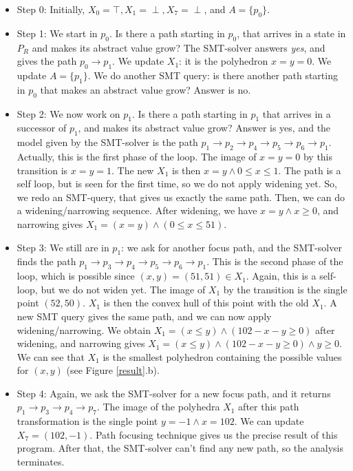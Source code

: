 \documentclass[a4paper,english,titlepage,11pt]{report}
\begin{document}
\begin{itemize}
\item Step 0: Initially, $X_0 = \top, X_1 = \perp, X_7 = \perp$, and $A =
\{p_0\}$.
\item Step 1: We start in $p_0$. Is there a path starting in $p_0$, that arrives
in a state in $P_R$ and makes its abstract value grow? The SMT-solver answers
\emph{yes}, and gives the path $p_0 \rightarrow p_1$. We update $X_1$:
it is the polyhedron $x=y=0$. We update $A = \{p_1\}$. 
We do another SMT query: is there another path
starting in $p_0$ that makes an abstract value grow? Answer is no.
\item Step 2: We now work on $p_1$. Is there a path starting in $p_1$ that
arrives in a successor of $p_1$, and makes its abstract value grow? Answer is
yes, and the model given by the SMT-solver is the path $p_1 \rightarrow p_2
\rightarrow p_4 \rightarrow p_5 \rightarrow p_6 \rightarrow p_1$. Actually, this
is the first phase of the loop. 
The image of $x=y=0$ by this transition is $x=y=1$. The new $X_1$ is then $x=y
\wedge 0\leq x \leq 1$. The path is a self loop, but is seen for the first time,
so we do not apply widening yet. So, we redo an SMT-query, that gives us exactly
the same path. Then, we can do a widening/narrowing sequence. 
After widening, we have $x=y \wedge x \geq 0$, and narrowing gives $X_1 = (x=y)
\wedge (0 \leq x \leq 51)$.
\item Step 3: We still are in $p_1$: we ask for another focus path, and the
SMT-solver finds the path $p_1 \rightarrow p_3
\rightarrow p_4 \rightarrow p_5 \rightarrow p_6 \rightarrow p_1$. This is the
second phase of the loop, which is possible since $(x,y)=(51,51) \in X_1$.
Again, this is a self-loop, but we do not widen yet. The
image of $X_1$ by the transition is the single point $(52,50)$. $X_1$ is then
the convex hull of this point with the old $X_1$. A new SMT query gives the same
path, and we can now apply widening/narrowing. We obtain
$X_1 = (x \leq y) \wedge (102 - x - y \geq 0)$ after widening, and narrowing
gives $X_1 = (x \leq y) \wedge (102 - x - y \geq 0) \wedge y \geq 0$.
We can see that $X_1$ is the smallest polyhedron containing the possible values
for $(x,y)$ (see Figure \ref{result}.b).
\item Step 4: Again, we ask the SMT-solver for a new focus path, and it returns
$p_1 \rightarrow p_3 \rightarrow p_4 \rightarrow p_7$. The image of the
polyhedra $X_1$ after this path transformation is the single point $y=-1 \wedge
x = 102$. We can update $X_7 = {(102,-1)}$. Path focusing technique gives us the
precise result of this program. After that, the SMT-solver can't find any new
path, so the analysis terminates.
\end{itemize}
\end{document}
